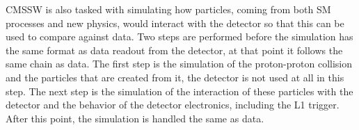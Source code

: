 CMSSW is also tasked with simulating how particles, coming from both SM processes and new physics, would interact with the detector so that this can be used to
compare against data. Two steps are performed before the simulation has the same format as data readout from the detector, at that
point it follows the same chain as data. The first step is the simulation of the proton-proton collision
and the particles that are created from it, the detector is not used at all in this step. The next step is the simulation of the interaction of these particles with the detector
and the behavior of the detector electronics, including the L1 trigger. After this point, the simulation is handled the same as data.